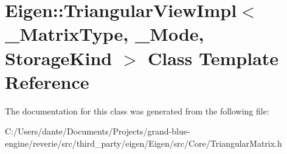 \hypertarget{class_eigen_1_1_triangular_view_impl}{}\section{Eigen\+::Triangular\+View\+Impl$<$ \+\_\+\+Matrix\+Type, \+\_\+\+Mode, Storage\+Kind $>$ Class Template Reference}
\label{class_eigen_1_1_triangular_view_impl}


The documentation for this class was generated from the following file\+:\begin{DoxyCompactItemize}
\item 
C\+:/\+Users/dante/\+Documents/\+Projects/grand-\/blue-\/engine/reverie/src/third\+\_\+party/eigen/\+Eigen/src/\+Core/Triangular\+Matrix.\+h\end{DoxyCompactItemize}
